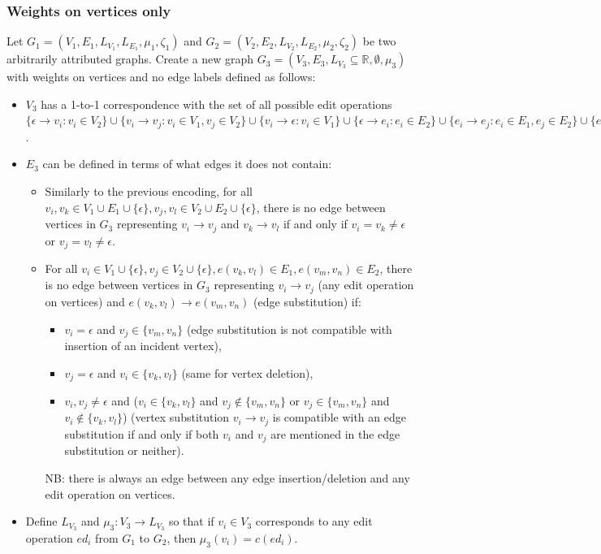\documentclass{article}
\theoremstyle{definition}
\begin{document}
\subsubsection{Weights on vertices only}
Let $G_1 = (V_1, E_1, L_{V_1}, L_{E_1}, \mu_1, \zeta_1)$ and $G_2 = (V_2, E_2, L_{V_2}, L_{E_2}, \mu_2, \zeta_2)$ be two arbitrarily attributed graphs. Create a new graph $G_3 = (V_3, E_3, L_{V_3} \subseteq \mathbb{R}, \emptyset, \mu_3)$ with weights on vertices and no edge labels defined as follows:
\begin{itemize}
\item $V_3$ has a 1-to-1 correspondence with the set of all possible edit operations $\{ \epsilon \to v_i : v_i \in V_2 \} \cup \{ v_i \to v_j : v_i \in V_1, v_j \in V_2 \} \cup \{ v_i \to \epsilon : v_i \in V_1 \} \cup \{ \epsilon \to e_i : e_i \in E_2 \} \cup \{ e_i \to e_j : e_i \in E_1, e_j \in E_2 \} \cup \{ e_i \to \epsilon : e_i \in E_1 \}$.
\item  $E_3$ can be defined in terms of what edges it does not contain:
  \begin{itemize}
  \item Similarly to the previous encoding, for all $v_i, v_k \in V_1 \cup E_1 \cup \{ \epsilon \}, v_j, v_l \in V_2 \cup E_2 \cup \{ \epsilon \}$, there is no edge between vertices in $G_3$ representing $v_i \to v_j$ and $v_k \to v_l$ if and only if $v_i = v_k \ne \epsilon$ or $v_j = v_l \ne \epsilon$.
  \item For all $v_i \in V_1 \cup \{ \epsilon \}, v_j \in V_2 \cup \{ \epsilon \}, e(v_k, v_l) \in E_1, e(v_m, v_n) \in E_2$, there is no edge between vertices in $G_3$ representing $v_i \to v_j$ (any edit operation on vertices) and $e(v_k, v_l) \to e(v_m, v_n)$ (edge substitution) if:
    \begin{itemize}
    \item $v_i = \epsilon$ and $v_j \in \{ v_m, v_n \}$ (edge substitution is not compatible with insertion of an incident vertex),
    \item $v_j = \epsilon$ and $v_i \in \{ v_k, v_l \}$ (same for vertex deletion),
    \item $v_i, v_j \ne \epsilon$ and ($v_i \in \{ v_k, v_l \}$ and $v_j \not \in \{ v_m, v_n \}$ or $v_j \in \{ v_m, v_n \}$ and $v_i \not \in \{ v_k, v_l \}$) (vertex substitution $v_i \to v_j$ is compatible with an edge substitution if and only if both $v_i$ and $v_j$ are mentioned in the edge substitution or neither).
    \end{itemize}
    NB: there is always an edge between any edge insertion/deletion and any edit operation on vertices.
  \end{itemize}
\item Define $L_{V_3}$ and $\mu_3: V_3 \to L_{V_3}$ so that if $v_i \in V_3$ corresponds to any edit operation $ed_i$ from $G_1$ to $G_2$, then $\mu_3(v_i) = c(ed_i)$.
\end{itemize}
\end{document}
